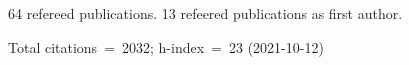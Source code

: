64 refereed publications. 13 refeered publications as first author.

Total citations~=~2032; h-index~=~23 (2021-10-12)